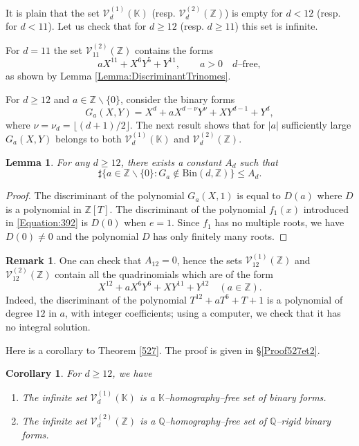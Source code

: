 \documentclass[10pt]{article}
\newtheorem{corollary}[theorem]{Corollary}
\newtheorem{lemma}[theorem]{Lemma}
\theoremstyle{definition}
\newtheorem{remark}[theorem]{Remark}
\numberwithin{equation}{section}
\newcommand {\Q}{{\mathbb{Q}}}
\newcommand {\Z}{{\mathbb{Z}}}
\newcommand {\K}{{\mathbb{K}}}
\newcommand{\Bin}{\mathrm {Bin}}
\begin{document}
It is plain that the set $\mathcal V^{(1)}_{d } (\K)$ (resp. $\mathcal V^{(2)}_{d} (\Z)$)
is empty for $d<12$ (resp. for $d<11$). Let us check that for $d\geqslant 12 $ (resp. $d\geqslant 11 $) this set is infinite.

For $d=11$ the set $\mathcal V^{(2)}_{11} (\Z)$ contains the forms
\[
aX^{11}+X^6Y^5+Y^{11}, \qquad a>0 \quad \text{$d$--free},
\]
 as shown by Lemma \ref{Lemma:DiscriminantTrinomes}. 
 
 For $d\geqslant 12$ and $a\in\Z\smallsetminus\{0\}$, consider the binary forms
\[
G_a(X,Y) = X^d + a X^{d-\nu} Y^\nu + XY^{d-1} +Y^d,
\]
where $\nu=\nu_d=\lfloor (d+1)/2\rfloor$.
The next result shows that for $|a|$ sufficiently large $G_a(X,Y) $ belongs to both $\mathcal V^{(1)}_{d } (\K)$ and $\mathcal V^{(2)}_{d} (\Z)$.

\begin{lemma} 
For any $d\geqslant 12$, there exists a constant $A_d$ such that 
\[
\sharp \{ a \in \Z\smallsetminus\{0\} : G_a \notin \Bin  (d, \Z)\} \leqslant A_d.
\]
\end{lemma}

\begin{proof} 
The discriminant of the polynomial $G_a (X,1)$ is equal to $D(a)$ where $D$ is a polynomial in $\Z[T]$. 
 The discriminant of the polynomial $f_1(x)$ introduced in \eqref{Equation:392} is $D(0)$ when $e=1$.
Since $f_1$ has no multiple roots, we have $D(0)\neq 0$ and the polynomial $D$ has only finitely many roots.
\end{proof} 
 
\begin{remark} 
One can check that $A_{12}=0$, hence the sets $\mathcal V^{(1)}_{12 } (\Z)$ and $\mathcal V^{(2)}_{12 } (\Z)$ contain all the quadrinomials which are of the form 
\[
X^{12}+aX^6Y^6+XY^{11}+Y^{12} \quad (a\in\Z).
\] 
Indeed, the discriminant of the polynomial $T^{12}+aT^6+T+1$ is a polynomial of degree $12$ in $a$, with integer coefficients; using a computer, we check that it has no integral solution. 
 \end{remark}
 
 \medskip
Here is a corollary to Theorem \ref{527}. The proof is given in \S \ref{Proof527et2}.

\begin{corollary}\label{Corollary2} For $d \geqslant 12$, we have 
\begin{enumerate}
\item The infinite set $\mathcal V^{(1)}_{d} (\K)$ 
is a $\K$--homography--free set of binary forms.
\item
The infinite set $\mathcal V^{(2)}_{d} (\Z)$ is a $\Q$--homography--free set of $\Q$--rigid binary forms.
\end{enumerate}
\end{corollary}
\end{document}
